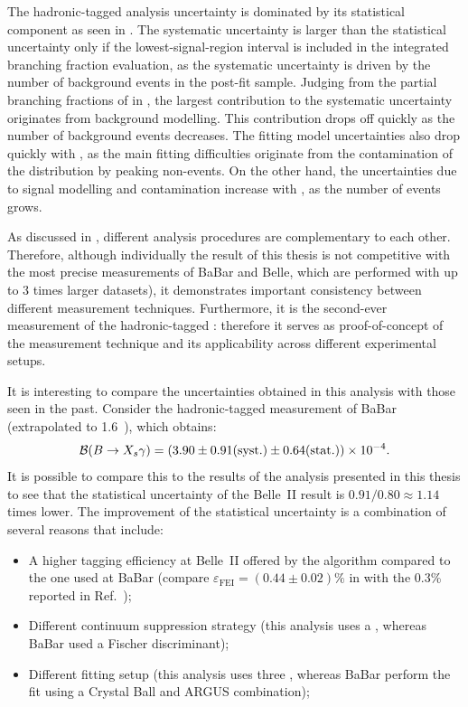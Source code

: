 The hadronic-tagged \BtoXsgamma analysis uncertainty is dominated by its statistical component as seen in .
The systematic uncertainty is larger than the statistical uncertainty only if the lowest-\EB signal-region interval is included in the integrated branching fraction evaluation, 
as the systematic uncertainty is driven by the number of background events in the post-fit sample.
Judging from the partial branching fractions of \BtoXsgamma in ,
the largest contribution to the systematic uncertainty originates from background modelling.
This contribution drops off quickly as the number of background events decreases.
The \Mbc fitting model uncertainties also drop quickly with \EB, as the main fitting difficulties originate from the contamination of the \Mbc distribution by peaking non-\BtoXsgamma events.
On the other hand, the uncertainties due to signal modelling and \BtoXdgamma contamination increase with \EB, as the number of \BtoXsdgamma events grows.

As discussed in , different analysis procedures are complementary to each other.
Therefore, although individually the result of this thesis is not competitive with the most precise measurements of BaBar and Belle, which are performed with up to 3 times larger datasets),
it demonstrates important consistency between different measurement techniques.
Furthermore, it is the second-ever measurement of the hadronic-tagged \BtoXsgamma: therefore it serves as proof-of-concept of the measurement technique and its applicability across different experimental setups.

It is interesting to compare the uncertainties obtained in this analysis with those seen in the past.
Consider the hadronic-tagged measurement of BaBar \cite{BaBar:2007yhb} (extrapolated to 1.6~\gev), which obtains:
\begin{equation}\label{eq:babar_measurement}
    \mathcal{B}(\BtoXsgamma) = (3.90 \pm 0.91 \mathrm{(syst.)} \pm 0.64 \mathrm{(stat.)}) \times 10^{-4}.
\end{equation}
It is possible to compare this to the results of the analysis presented in this thesis
to see that the statistical uncertainty of the Belle~II result is $0.91/0.80\approx1.14$ times lower.
The improvement of the statistical uncertainty is a combination of several reasons that include:
\begin{itemize}
    \item A higher tagging efficiency at Belle~II offered by the \FEI algorithm compared to the one used at BaBar (compare $\varepsilon_{\mathrm{FEI}} = (0.44\pm0.02)\%$ in  with the 0.3\% reported in Ref.~\cite{BaBar:2007yhb});
    \item Different continuum suppression strategy (this analysis uses a \BDT, whereas BaBar used a Fischer discriminant);
    \item Different fitting setup (this analysis uses three , whereas BaBar perform the fit using a Crystal Ball and ARGUS \PDF combination);
\end{itemize}

